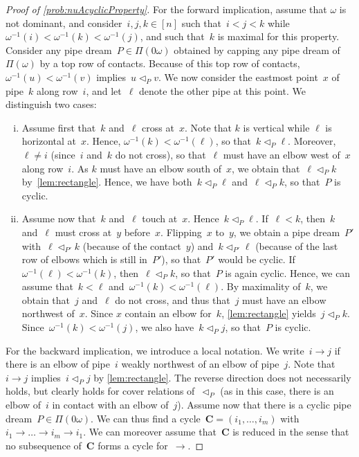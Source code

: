 \documentclass[reqno]{amsart}
\theoremstyle{definition}
\renewcommand{\b}[1]{\boldsymbol{#1}} %
\newcommand{\pipeDreams}{\Pi} %
\newcommand{\less}{\vartriangleleft} %
\newcommand{\contactLess}[1]{\less_{#1}} %
\begin{document}
\begin{proof}[Proof of \cref{prob:nuAcyclicProperty}]
For the forward implication, assume that $\omega$ is not dominant, and consider~${i,j,k \in [n]}$ such that~$i < j < k$ while~$\omega^{-1}(i) < \omega^{-1}(k) < \omega^{-1}(j)$, and such that~$k$ is maximal for this property.
Consider any pipe dream~$P \in \pipeDreams(0\omega)$ obtained by capping any pipe dream of~$\pipeDreams(\omega)$ by a top row of contacts.
Because of this top row of contacts, $\omega^{-1}(u) < \omega^{-1}(v)$ implies~$u \contactLess{P} v$.
We now consider the eastmost point~$x$ of pipe~$k$ along row~$i$, and let~$\ell$ denote the other pipe at this point.
We distinguish two cases:
\begin{enumerate}[(i)]
\item Assume first that~$k$ and~$\ell$ cross at~$x$. Note that $k$ is vertical while $\ell$ is horizontal at~$x$. Hence, $\omega^{-1}(k) < \omega^{-1}(\ell)$,  so that~$k \contactLess{P} \ell$. Moreover, $\ell \ne i$ (since~$i$ and~$k$ do not cross), so that~$\ell$ must have an elbow west of~$x$ along row~$i$. As $k$ must have an elbow south of~$x$, we obtain that~$\ell \contactLess{P} k$ by~\cref{lem:rectangle}. Hence, we have both~$k \contactLess{P} \ell$ and~$\ell \contactLess{P} k$, so that~$P$ is cyclic.
\item Assume now that~$k$ and~$\ell$ touch at~$x$. Hence~$k \contactLess{P} \ell$. If~$\ell < k$, then~$k$ and~$\ell$ must cross at~$y$ before~$x$. Flipping~$x$ to~$y$, we obtain a pipe dream~$P'$ with~$\ell \contactLess{P'} k$ (because of the contact~$y$) and~$k \contactLess{P'} \ell$ (because of the last row of elbows which is still in~$P'$), so that~$P'$ would be cyclic. If~$\omega^{-1}(\ell) < \omega^{-1}(k)$, then~$\ell \contactLess{P} k$, so that~$P$ is again cyclic. Hence, we can assume that~$k < \ell$ and~$\omega^{-1}(k) < \omega^{-1}(\ell)$. By maximality of~$k$, we obtain that~$j$ and~$\ell$ do not cross, and thus that~$j$ must have an elbow northwest of~$x$. Since $x$ contain an elbow for~$k$, \cref{lem:rectangle} yields~$j \contactLess{P} k$. Since~$\omega^{-1}(k) < \omega^{-1}(j)$, we also have~$k \contactLess{P} j$, so that~$P$ is cyclic.
\end{enumerate}

For the backward implication, we introduce a local notation.
We write~$i \to j$ if there is an elbow of pipe~$i$ weakly northwest of an elbow of pipe~$j$.
Note that~$i \to j$ implies~$i \contactLess{P} j$ by \cref{lem:rectangle}.
The reverse direction does not necessarily holds, but clearly holds for cover relations of~$\contactLess{P}$ (as in this case, there is an elbow of~$i$ in contact with an elbow of~$j$).
Assume now that there is a cyclic pipe dream~$P \in \pipeDreams(0\omega)$.
We can thus find a cycle~$\b{C}=(i_1, \dots, i_m)$ with~$i_1 \to \dots \to i_m \to i_1$.
We can moreover assume that~$\b{C}$ is reduced in the sense that no subsequence of~$\b{C}$ forms a cycle for~$\to$.


\end{proof}
\end{document}
